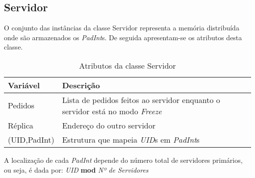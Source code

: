 \subsection{Servidor}
O conjunto das instâncias da classe Servidor representa a memória distribuída onde são armazenados os \textit{PadInt}s. De seguida apresentam-se os atributos desta classe.
\begin{table}[H]
\centering
\begin{tabular}{| p{2cm} | p{} |}
\hline
\textbf{Variável} & \textbf{Descrição} \\
\hline
Pedidos & Lista de pedidos feitos ao servidor enquanto o servidor está no modo \textit{Freeze} \\
\hline
Réplica & Endereço do outro servidor \\
\hline
(UID,PadInt) & Estrutura que mapeia \textit{UID}s em \textit{PadInt}s \\
\hline
\end{tabular}
\caption{Atributos da classe Servidor}
\end{table}

A localização de cada \textit{PadInt} depende do número total de servidores primários, ou seja, é dada por: \textit{UID} \textbf{mod}  \textit{Nº de Servidores}

